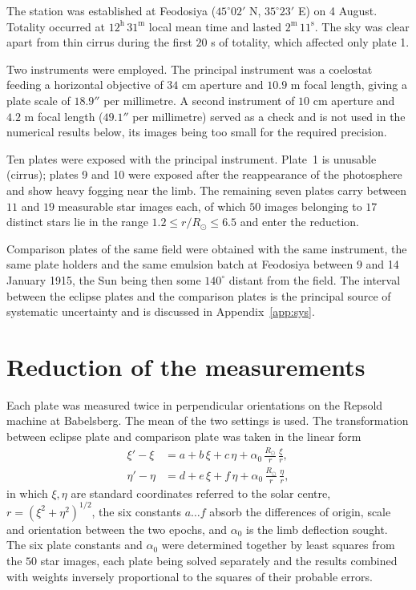 \documentclass[aps,prd,reprint,amsmath,amssymb,nofootinbib,longbibliography]{revtex4-2}
\begin{document}
The station was established at Feodosiya ($45^\circ 02'$ N, $35^\circ 23'$ E) on 4 August. Totality
occurred at $12^{\mathrm{h}}\,31^{\mathrm{m}}$ local mean time and lasted $2^{\mathrm{m}}\,11^{\mathrm{s}}$.
The sky was clear apart from thin cirrus during the first $20$ s of totality, which affected only
plate 1.

Two instruments were employed. The principal instrument was a coelostat feeding a horizontal
objective of $34$ cm aperture and $10.9$ m focal length, giving a plate scale of $18.9''$ per
millimetre. A second instrument of $10$ cm aperture and $4.2$ m focal length ($49.1''$ per
millimetre) served as a check and is not used in the numerical results below, its images being too
small for the required precision.

Ten plates were exposed with the principal instrument. Plate~1 is unusable (cirrus); plates 9 and
10 were exposed after the reappearance of the photosphere and show heavy fogging near the limb.
The remaining seven plates carry between $11$ and $19$ measurable star images each, of which
$50$ images belonging to $17$ distinct stars lie in the range $1.2 \le r/R_\odot \le 6.5$ and enter
the reduction.

Comparison plates of the same field were obtained with the same instrument, the same plate holders
and the same emulsion batch at Feodosiya between 9 and 14 January 1915, the Sun being then some
$140^\circ$ distant from the field. The interval between the eclipse plates and the comparison
plates is the principal source of systematic uncertainty and is discussed in Appendix~\ref{app:sys}.

\section{Reduction of the measurements}
\label{sec:red}

Each plate was measured twice in perpendicular orientations on the Repsold machine at Babelsberg.
The mean of the two settings is used. The transformation between eclipse plate and comparison plate
was taken in the linear form
\begin{equation}
\begin{aligned}
\xi' - \xi &= a + b\,\xi + c\,\eta + \alpha_0 \, \frac{R_\odot}{r}\,\frac{\xi}{r} ,\\
\eta' - \eta &= d + e\,\xi + f\,\eta + \alpha_0 \, \frac{R_\odot}{r}\,\frac{\eta}{r} ,
\end{aligned}
\label{eq:plate}
\end{equation}
in which $\xi,\eta$ are standard coordinates referred to the solar centre, $r=(\xi^2+\eta^2)^{1/2}$,
the six constants $a \dots f$ absorb the differences of origin, scale and orientation between the
two epochs, and $\alpha_0$ is the limb deflection sought. The six plate constants and $\alpha_0$
were determined together by least squares from the $50$ star images, each plate being solved
separately and the results combined with weights inversely proportional to the squares of their
probable errors.
\end{document}
